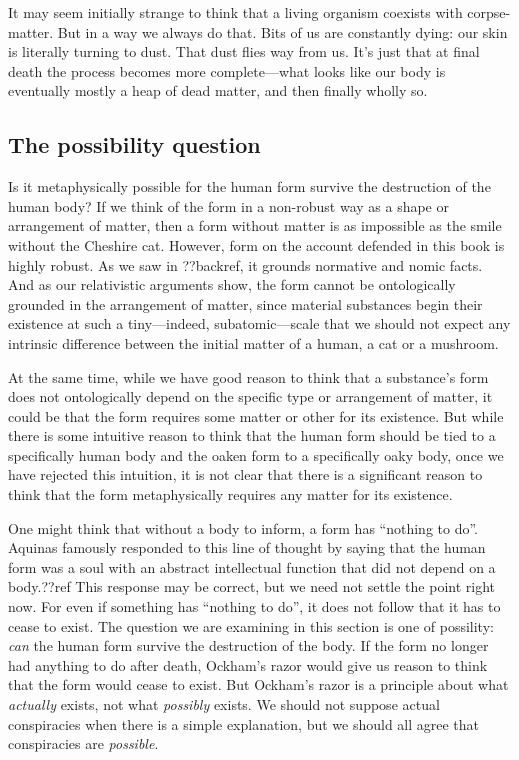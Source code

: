 It may seem initially strange to think that a living organism coexists with corpse-matter. But in a way we always do 
that. Bits of us are constantly dying: our skin is literally turning to dust. That dust flies way from us. It's just
that at final death the process becomes more complete---what looks like our body is eventually mostly a heap of dead matter, and then finally wholly so. 

\subsection{The possibility question}
Is it metaphysically possible for the human form survive the destruction of the human body? If we think of the form in a non-robust way as 
a shape or arrangement of matter, then a form without matter is as 
impossible as the smile without the Cheshire cat. However, form on the account defended in this book is highly robust. 
As we saw in ??backref, it grounds normative and nomic facts. And as our relativistic arguments show, the form cannot
be ontologically grounded in the arrangement of matter, since material substances begin their existence at such a tiny---indeed, subatomic---scale  that we should not expect any intrinsic difference between the initial matter of a human, a cat or a mushroom.

At the same time, while we have good reason to think that a substance's form does not ontologically depend on the specific type or arrangement of matter, it could be that the form requires some matter or other for its existence. But while there is some intuitive 
reason to think that the human form should be tied to a specifically human body and the oaken form to a specifically oaky body,
once we have rejected this intuition, it is not clear that there is a significant reason to think that the form 
metaphysically requires any 
matter for its existence. 

One might think that without a body to inform, a form has ``nothing to do''. Aquinas famously responded to this line of thought
by saying that the human form was a soul with an abstract intellectual function that did not depend on a body.??ref This response may 
be correct, but we need not settle the point right now. For even if something has ``nothing to do'', it does not follow that 
it has to cease to exist. The question we are examining in this section is one of possility: \textit{can} the human form survive the 
destruction of the body. If the form no longer had anything to do after death, Ockham's razor would give us reason to think that the form would cease to exist. But Ockham's razor is a principle about what \textit{actually} exists, not what \textit{possibly}
exists. We should not suppose actual conspiracies when there is a simple explanation, but we should all agree that conspiracies
are \textit{possible}. 

